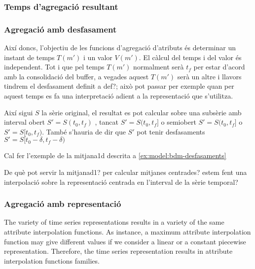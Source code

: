 \subsubsection{Temps d'agregació resultant}
\subsubsection{Agregació amb desfasament}



Així doncs, l'objectiu de les funcions d'agregació d'atributs és determinar un instant de temps $T(m')$ i un valor $V(m')$. El càlcul del temps i del valor és independent. Tot i que pel temps $T(m')$  normalment serà $t_f$ per estar d'acord amb la consolidació del buffer, a vegades aquest $T(m')$ serà un altre i llavors tindrem el desfasament definit a def?; això pot passar per exemple quan per aquest temps es fa una interpretació adient a la representació que s'utilitza.\todo{} 


Així sigui $S$ la sèrie original, el resultat es pot
calcular sobre una subsèrie amb interval obert $S'=S(t_0,t_f)$ ,
tancat $S'=S(t_0,t_f]$ o semiobert $S'=S(t_0,t_f]$ o
$S'=S[t_0,t_f)$.
També s'hauria de dir que $S'$ pot tenir desfasaments $S'=S[t_0-\delta,t_f-\delta)$


\todo{}
Cal fer l'exemple de la mitjana1d descrita a \ref{ex:model:bdm-desfasaments}

De què pot servir la mitjanad1? per calcular mitjanes centrades? estem fent una interpolació sobre la representació centrada en l'interval de la sèrie temporal? \todo{}







\subsubsection{Agregació amb representació}








The variety of time series representations results in a variety of the
same attribute interpolation functions. As instance, a maximum
attribute interpolation function may give different values if we
consider a linear or a constant piecewise representation. Therefore,
the time series representation results in attribute interpolation
functions families.




